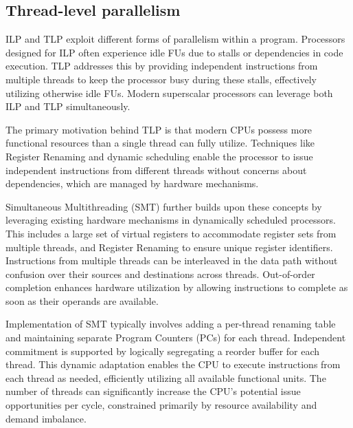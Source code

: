 \subsection{Thread-level parallelism}
ILP and TLP exploit different forms of parallelism within a program.
Processors designed for ILP often experience idle FUs due to stalls or dependencies in code execution. 
TLP addresses this by providing independent instructions from multiple threads to keep the processor busy during these stalls, effectively utilizing otherwise idle FUs. 
Modern superscalar processors can leverage both ILP and TLP simultaneously.

The primary motivation behind TLP is that modern CPUs possess more functional resources than a single thread can fully utilize. 
Techniques like Register Renaming and dynamic scheduling enable the processor to issue independent instructions from different threads without concerns about dependencies, which are managed by hardware mechanisms.

Simultaneous Multithreading (SMT) further builds upon these concepts by leveraging existing hardware mechanisms in dynamically scheduled processors. 
This includes a large set of virtual registers to accommodate register sets from multiple threads, and Register Renaming to ensure unique register identifiers. 
Instructions from multiple threads can be interleaved in the data path without confusion over their sources and destinations across threads. 
Out-of-order completion enhances hardware utilization by allowing instructions to complete as soon as their operands are available.

Implementation of SMT typically involves adding a per-thread renaming table and maintaining separate Program Counters (PCs) for each thread. 
Independent commitment is supported by logically segregating a reorder buffer for each thread. 
This dynamic adaptation enables the CPU to execute instructions from each thread as needed, efficiently utilizing all available functional units. 
The number of threads can significantly increase the CPU's potential issue opportunities per cycle, constrained primarily by resource availability and demand imbalance.